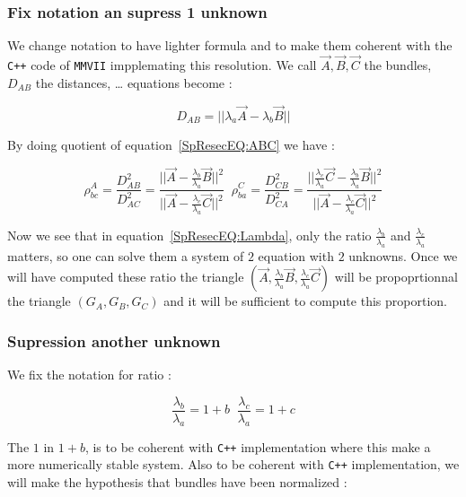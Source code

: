 \subsubsection{Fix notation an supress 1 unknown}

We change notation to have lighter formula and to make them coherent with the {\tt C++} code of {\tt MMVII}
impplemating this resolution. We call $\Vec{A} , \Vec{B}, \Vec{C}$  the bundles, $D_{AB}$ the distances, \dots
equations become :

\begin{equation}
	D_{AB} = || \lambda_a \Vec{A} -  \lambda_{b} \Vec{B} || \label{SpResecEQ:ABC}
\end{equation}

By doing quotient of equation~\ref{SpResecEQ:ABC} we have :

\begin{equation}
	\rho^A_{bc}  
	=	\frac{D^2_{AB}}{D^2_{AC}} 
	= \frac{|| \Vec{A} -  \frac{\lambda_{b}}{\lambda_{a}} \Vec{B} ||^2 }{||\Vec{A} -  \frac{\lambda_{c}}{\lambda_{a}} \Vec{C}||^2}
	\;\;
	\rho^C_{ba}  
	=	\frac{D^2_{CB}}{D^2_{CA}} 
	= \frac{|| \frac{\lambda_{c}}{\lambda_{a}} \Vec{C} -  \frac{\lambda_{b}}{\lambda_{a}} \Vec{B} ||^2 }
	       {||\Vec{A} -  \frac{\lambda_{c}}{\lambda_{a}} \Vec{C}||^2}
	       \label{SpResecEQ:Lambda}
\end{equation}

Now we see that in equation~\ref{SpResecEQ:Lambda}, only the ratio $\frac{\lambda_{b}}{\lambda_{a}}$ and $\frac{\lambda_{c}}{\lambda_{a}}$
matters, so one can solve them a system of $2$ equation with $2$ unknowns. Once we will have computed these ratio the triangle
$(\Vec{A} , \frac{\lambda_{b}}{\lambda_{a}} \Vec{B},  \frac{\lambda_{c}}{\lambda_{a}} \Vec{C})$ will be propoprtionnal the
triangle $(G_A,G_B,G_C)$ and it will be sufficient to compute this proportion.


\subsubsection{Supression another unknown}

We fix the notation for ratio :

\begin{equation}
	\frac{\lambda_{b}}{\lambda_{a}} = 1+ b  \;\;
	\frac{\lambda_{c}}{\lambda_{a}} = 1+ c
\end{equation}


The $1$ in $1+b$, is to be coherent with {\tt C++} implementation where this make a more numerically stable system.
Also to be coherent with {\tt C++} implementation, we will make the hypothesis that bundles have been normalized :

